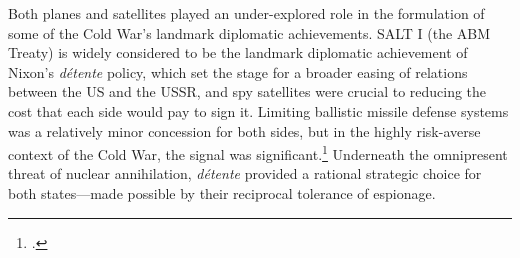 \documentclass[14pt]{extarticle}
\begin{document}
Both planes and satellites played an under-explored role in the formulation of some of the Cold War's landmark diplomatic achievements. SALT I (the ABM Treaty) is widely considered to be the landmark diplomatic achievement of Nixon's \emph{d\'etente} policy, which set the stage for a broader easing of relations between the US and the USSR, and spy satellites were crucial to reducing the cost that each side would pay to sign it. Limiting ballistic missile defense systems was a relatively minor concession for both sides, but in the highly risk-averse context of the Cold War, the signal was significant.\footcite[p.~66]{glaser_rational_2010} Underneath the omnipresent threat of nuclear annihilation, \emph{d\'etente} provided a rational strategic choice for both states---made possible by their reciprocal tolerance of espionage.


\end{document}
